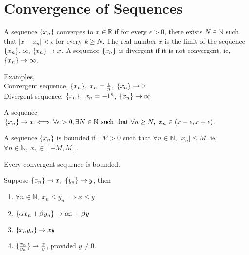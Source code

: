 \section{Convergence of Sequences}
	\begin{definition}[convergence]
		A sequence $\{x_n\}$ converges to $x \in \mathbb{R}$ if for every $\epsilon > 0$, there exists $N \in \mathbb{N}$ such that $|x-x_n| < \epsilon$ for every $k \ge N$. The real number $x$ is the limit of the sequence $\{x_n\}$. ie, $\{x_n\} \to x$. A sequence $\{x_n\}$ is divergent if it is not convergent. ie, $\{x_n\} \to \infty$.
	\end{definition}
	
	\begin{remark}Examples,\\
		Convergent sequence, $\{x_n\},\ x_n = \frac{1}{n}$, $\{x_n\} \to 0$\\
		Divergent sequence, $\{x_n\},\ x_n = -1^n$, $\{x_n\} \to \infty$
	\end{remark}

	\begin{remark}
		A sequence $\{x_n\} \to x \iff \forall \epsilon > 0,\\ \exists N \in \mathbb{N} \text{ such that } \forall n \ge N,\ x_n \in (x-\epsilon,x+\epsilon)$.
	\end{remark}

	\begin{definition}[bounded]
		A sequence $\{x_n\}$ is bounded if $\exists M >0$ such that $\forall n \in \mathbb{N},\ |x_n| \le M$. ie, $\forall n \in \mathbb{N},\ x_n \in [-M,M]$.
	\end{definition}

	\begin{remark}
		Every convergent sequence is bounded.
	\end{remark}

	\begin{theorem}
		Suppose $\sequence{x_n} \to x,\ \sequence{y_n} \to y$, then
		\begin{enumerate}
			\item $\forall n \in \mathbb{N},\ x_n \le y_n \implies x \le y$
			\item $\{\alpha x_n + \beta y_n\} \to \alpha x + \beta y$
			\item $\{x_n y_n\} \to xy$
			\item $\{\frac{x_n}{y_n}\} \to \frac{x}{y}$, provided $y \ne 0$.
		\end{enumerate}
	\end{theorem}

